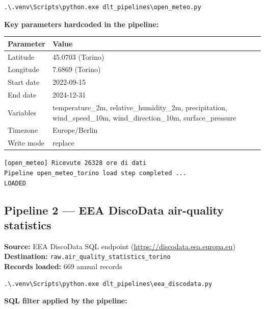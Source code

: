 \documentclass[11pt,a4paper]{article}
\begin{document}
\begin{lstlisting}[style=shell]
.\.venv\Scripts\python.exe dlt_pipelines\open_meteo.py
\end{lstlisting}

\textbf{Key parameters hardcoded in the pipeline:}

\begin{table}[h!]
\centering\small
{}
\begin{tabular}{@{}ll@{}}
\toprule
\textbf{Parameter} & \textbf{Value} \\
\midrule
Latitude  & 45.0703 (Torino) \\
Longitude & 7.6869 (Torino) \\
Start date & 2022-09-15 \\
End date   & 2024-12-31 \\
Variables  & temperature\_2m, relative\_humidity\_2m, precipitation, wind\_speed\_10m, wind\_direction\_10m, surface\_pressure \\
Timezone   & Europe/Berlin \\
Write mode & replace \\
\bottomrule
\end{tabular}
\end{table}

\begin{tcolorbox}[successbox,title=Expected terminal output]
\texttt{[open\_meteo] Ricevute 26328 ore di dati}\\
\texttt{Pipeline open\_meteo\_torino load step completed ...}\\
\texttt{LOADED}
\end{tcolorbox}

\subsection{Pipeline 2 — EEA DiscoData air-quality statistics}

\textbf{Source:} EEA DiscoData SQL endpoint (\url{https://discodata.eea.europa.eu})\\
\textbf{Destination:} \texttt{raw.air\_quality\_statistics\_torino}\\
\textbf{Records loaded:} 669 annual records

\begin{lstlisting}[style=shell]
.\.venv\Scripts\python.exe dlt_pipelines\eea_discodata.py
\end{lstlisting}

\textbf{SQL filter applied by the pipeline:}
\end{document}
